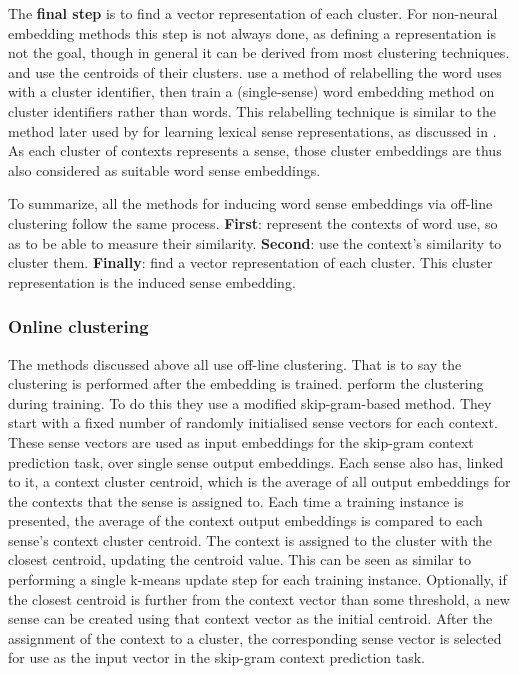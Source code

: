 {The \textbf{final step} is to find a vector representation of each cluster.
For non-neural embedding methods this step is not always done, as defining a representation is not the goal, though in general it can be derived from most clustering techniques.
\textcite{Schutze:1998wordsenseclustering} and 
\textcite{kaageback2015neural} use the centroids of their clusters.
\textcite{Huang2012} use a method of relabelling the word uses with a cluster identifier,
then train a (single-sense) word embedding method on cluster identifiers rather than words.
This relabelling technique is similar to the method later used by \textcite{Chen2014} for learning lexical sense representations, as discussed in .
As each cluster of contexts represents a sense, those cluster embeddings are thus also considered as  suitable word sense embeddings.

To summarize, all the methods for inducing word sense embeddings via off-line clustering follow the same process.
\textbf{First}: represent the contexts of word use, so as to be able to measure their similarity.
\textbf{Second}: use the context's similarity to cluster them.
\textbf{Finally}: find a vector representation of each cluster.
This cluster representation is the induced sense embedding.

\subsubsection{Online clustering}
The methods discussed above all use off-line clustering.
That is to say the clustering is performed after the embedding is trained.
 perform the clustering during training.
To do this they use a modified skip-gram-based method.
They start with a fixed number of randomly initialised sense vectors for each context.
These sense vectors are used as input embeddings for the skip-gram context prediction task, over single sense output embeddings.
Each sense also has, linked to it, a context cluster centroid, which is the average of all output embeddings for the contexts that the sense is assigned to.
Each time a training instance is presented, the average of the context output embeddings is compared to each sense's context cluster centroid.
The context is assigned to the cluster with the closest centroid, updating the centroid value.
This can be seen as similar to performing a single k-means update step for each training instance.
Optionally, if the closest centroid is further from the context vector than some threshold,  a new sense can be created using that context vector as the initial centroid.
After the assignment of the context to a cluster, the corresponding sense vector is selected for use as the input vector in the skip-gram context prediction task.

}
